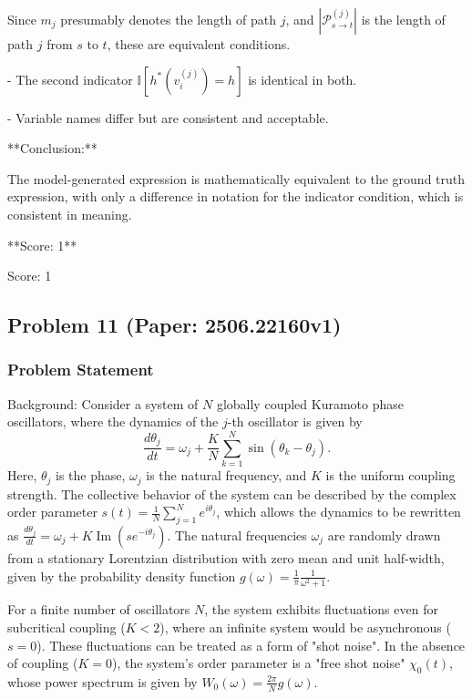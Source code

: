 \documentclass[10pt]{article}
\begin{document}
  Since $m_j$ presumably denotes the length of path $j$, and $|\mathcal{P}^{(j)}_{s \to t}|$ is the length of path $j$ from $s$ to $t$, these are equivalent conditions.
  
- The second indicator $\mathbb{I}[h^*(v^{(j)}_i) = h]$ is identical in both.

- Variable names differ but are consistent and acceptable.

**Conclusion:**

The model-generated expression is mathematically equivalent to the ground truth expression, with only a difference in notation for the indicator condition, which is consistent in meaning.

**Score: 1**

Score: 1

\newpage
\subsection*{Problem 11 (Paper: 2506.22160v1)}
\subsubsection*{Problem Statement}
Background:
Consider a system of $N$ globally coupled Kuramoto phase oscillators, where the dynamics of the $j$-th oscillator is given by
$$ \frac{d\theta_j}{dt} = \omega_j + \frac{K}{N}\sum_{k=1}^N \sin(\theta_k - \theta_j). $$
Here, $\theta_j$ is the phase, $\omega_j$ is the natural frequency, and $K$ is the uniform coupling strength. The collective behavior of the system can be described by the complex order parameter $s(t) = \frac{1}{N} \sum_{j=1}^N e^{i \theta_j}$, which allows the dynamics to be rewritten as $\frac{d\theta_j}{dt} = \omega_j + K \operatorname{Im}(s e^{-i\theta_j})$. The natural frequencies $\omega_j$ are randomly drawn from a stationary Lorentzian distribution with zero mean and unit half-width, given by the probability density function $g(\omega) = \frac{1}{\pi}\frac{1}{\omega^2+1}$.

For a finite number of oscillators $N$, the system exhibits fluctuations even for subcritical coupling ($K<2$), where an infinite system would be asynchronous ($s=0$). These fluctuations can be treated as a form of "shot noise". In the absence of coupling ($K=0$), the system's order parameter is a "free shot noise" $\chi_0(t)$, whose power spectrum is given by $W_0(\omega) = \frac{2\pi}{N}g(\omega)$.
\end{document}
